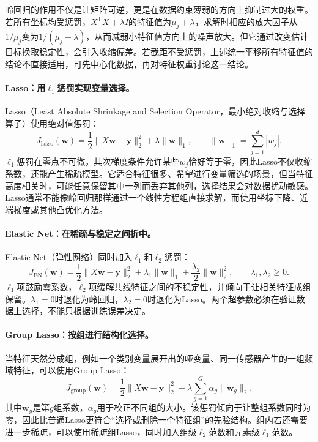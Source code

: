 岭回归的作用不仅是让矩阵可逆，更是在数据约束薄弱的方向上抑制过大的权重。若所有坐标均受惩罚，$X^{\mathsf T}X+\lambda I$的特征值为$\mu_j+\lambda$，求解时相应的放大因子从$1/\mu_j$变为$1/(\mu_j+\lambda)$，从而减弱小特征值方向上的噪声放大。但它通过改变估计目标换取稳定性，会引入收缩偏差。若截距不受惩罚，上述统一平移所有特征值的结论不直接适用，可先中心化数据，再对特征权重讨论这一结论。

\paragraph{Lasso：用$\ell_1$惩罚实现变量选择。}
Lasso（Least Absolute Shrinkage and Selection Operator，最小绝对收缩与选择算子）使用绝对值惩罚：
\begin{equation}
 J_{\mathrm{lasso}}(\bm w)=\frac12\|X\bm w-\bm y\|_2^2+\lambda\|\bm w\|_1,
 \qquad \|\bm w\|_1=\sum_{j=1}^d|w_j|.
 \label{eq:linear-lasso-objective}
\end{equation}
$\ell_1$惩罚在零点不可微，其次梯度条件允许某些$w_j$恰好等于零，因此Lasso不仅收缩系数，还能产生稀疏模型。它适合特征很多、希望进行变量筛选的场景，但当特征高度相关时，可能任意保留其中一列而丢弃其他列，选择结果会对数据扰动敏感。Lasso通常不能像岭回归那样通过一个线性方程组直接求解，而使用坐标下降、近端梯度或其他凸优化方法。

\paragraph{Elastic Net：在稀疏与稳定之间折中。}
Elastic Net（弹性网络）同时加入$\ell_1$和$\ell_2$惩罚：
\begin{equation}
 J_{\mathrm{EN}}(\bm w)=\frac12\|X\bm w-\bm y\|_2^2
 +\lambda_1\|\bm w\|_1+\frac{\lambda_2}{2}\|\bm w\|_2^2,
 \qquad \lambda_1,\lambda_2\geq0.
 \label{eq:linear-elastic-net-objective}
\end{equation}
$\ell_1$项鼓励零系数，$\ell_2$项缓解共线特征之间的不稳定性，并倾向于让相关特征成组保留。$\lambda_1=0$时退化为岭回归，$\lambda_2=0$时退化为Lasso。两个超参数必须在验证数据上选择，不能只根据训练误差决定。

\paragraph{Group Lasso：按组进行结构化选择。}
当特征天然分成组，例如一个类别变量展开出的哑变量、同一传感器产生的一组频域特征，可以使用Group Lasso：
\begin{equation}
 J_{\mathrm{group}}(\bm w)=\frac12\|X\bm w-\bm y\|_2^2
 +\lambda\sum_{g=1}^G\alpha_g\|\bm w_g\|_2.
 \label{eq:linear-group-lasso-objective}
\end{equation}
其中$\bm w_g$是第$g$组系数，$\alpha_g$用于校正不同组的大小。该惩罚倾向于让整组系数同时为零，因此比普通Lasso更符合“选择或删除一个特征组”的先验结构。组内若还需要进一步稀疏，可以使用稀疏组Lasso，同时加入组级$\ell_2$范数和元素级$\ell_1$范数。

